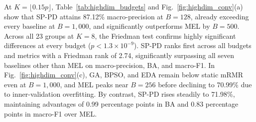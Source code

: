 At $K = \lfloor 0.15p \rfloor$, Table~\ref{tab:highdim_budgets} and Fig.~\ref{fig:highdim_conv}(a) show that SP-PD attains 87.12\% macro-precision at $B = 128$, already exceeding every baseline at $B = 1{,}000$, and significantly outperforms MEL by $B = 500$. Across all 23 groups at $K = 8$, the Friedman test confirms highly significant differences at every budget ($p < 1.3 \times 10^{-9}$). SP-PD ranks first across all budgets and metrics with a Friedman rank of 2.74, significantly surpassing all seven baselines other than MEL on macro-precision, BA, and macro-F1. In Fig.~\ref{fig:highdim_conv}(c), GA, BPSO, and EDA remain below static mRMR even at $B = 1{,}000$, and MEL peaks near $B = 256$ before declining to 70.99\% due to inner-validation overfitting. By contrast, SP-PD rises steadily to 71.98\%, maintaining advantages of 0.99 percentage points in BA and 0.83 percentage points in macro-F1 over MEL.


